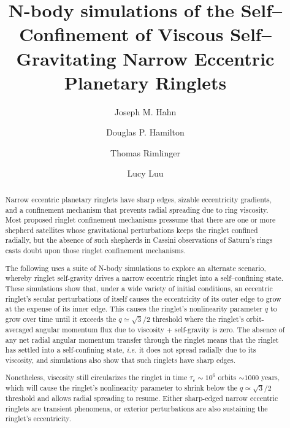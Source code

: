 \documentclass[preprint]{aastex62}
\begin{document}
\title{N-body simulations of the Self--Confinement of 
Viscous Self--Gravitating Narrow Eccentric Planetary Ringlets}


\author{Joseph M. Hahn}

\author{Douglas P. Hamilton}

\author{Thomas Rimlinger}

\author{Lucy Luu}


\begin{abstract}

Narrow eccentric planetary ringlets have sharp edges, sizable eccentricity gradients, and a 
confinement mechanism that prevents radial spreading due to ring viscosity. 
Most proposed ringlet confinement mechanisms pressume that there are one or more 
shepherd satellites whose gravitational perturbations keeps the ringlet confined radially, 
but the absence of such shepherds in Cassini observations of Saturn's rings
casts doubt upon those ringlet confinement mechanisms.

The following uses a suite of N-body simulations to explore an alternate scenario,
whereby ringlet self-gravity drives a narrow eccentric ringlet into a 
self--confining state. These simulations show that, under a wide variety of initial conditions,
an eccentric ringlet's secular perturbations of itself causes the eccentricity of its outer
edge to grow at the expense of its inner edge. This causes the
ringlet's nonlinearity parameter $q$
to grow over time until it exceeds the $q\simeq\sqrt{3}/2$ threshold where 
the ringlet's orbit-averaged angular momentum flux due to viscosity + self-gravity is zero.
The absence of any net radial angular momentum transfer through the ringlet 
means that the ringlet has settled into a self-confining state, {\it i.e.} it does 
not spread radially due to its viscosity, and simulations also show that such ringlets have sharp edges.

Nonetheless, viscosity still circularizes the ringlet in time $\tau_e\sim10^6$ orbits $\sim1000$ years, 
which will cause the ringlet's nonlinearity parameter to shrink below the 
$q\simeq\sqrt{3}/2$ threshold and allows radial spreading to resume. Either sharp-edged
narrow eccentric ringlets are transient phenomena, or exterior perturbations 
are also sustaining the ringlet's eccentricity.


\end{abstract}
\end{document}
